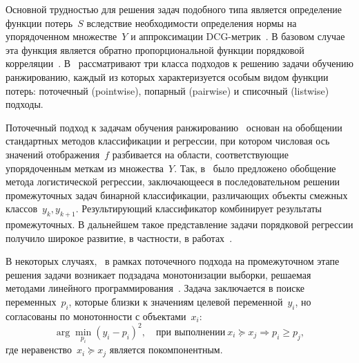 \documentclass{elsarticle}
\begin{document}

Основной трудностью для решения задач подобного типа является определение функции потерь~$S$ вследствие необходимости определения нормы на упорядоченном множестве~$Y$ и аппроксимации DCG-метрик~\cite{chen2009ranking}. В базовом случае эта функция является обратно пропорциональной функции порядковой корреляции~\cite{kendall1938new}. В~\cite{hang2011short} рассматривают три класса подходов к решению задачи обучению ранжированию, каждый из которых характеризуется особым видом функции потерь: поточечный (pointwise), попарный (pairwise) и списочный (listwise) подходы.

Поточечный подход к задачам обучения ранжированию~\cite{cossock2006subset, shashua2002ranking} основан на обобщении стандартных методов классификации и регрессии, при котором числовая ось значений отображения~$f$ разбивается на области, соответствующие упорядоченным меткам из множества~$Y$. Так, в~\cite{mccullagh1980regression} было предложено обобщение метода логистической регрессии, заключающееся в последовательном решении промежуточных задач бинарной классификации, различающих объекты смежных классов~$y_k,y_{k+1}$. Результирующий классификатор комбинирует результаты промежуточных. В дальнейшем такое представление задачи порядковой регрессии получило широкое развитие, в частности, в работах~\cite{Kotlowski2013, cardoso2007learning}.

В некоторых случаях,~\cite{Kotlowski2013, Spirin2011} в рамках поточечного подхода на промежуточном этапе решения задачи возникает подзадача монотонизации выборки, решаемая методами линейного программирования~\cite{StephenBoyd}. Задача заключается в поиске переменных~$p_i$, которые близки к значениям целевой переменной~$y_i$, но согласованы по монотонности с объектами~$x_i$:
\[
\arg\min_{p_i}(y_i-p_i)^2, \quad \text{при выполнении}~x_i \succeq x_j \Rightarrow p_i \geq p_j,
\]
где неравенство~$x_i \succeq x_j$ является покомпонентным.
\end{document}
